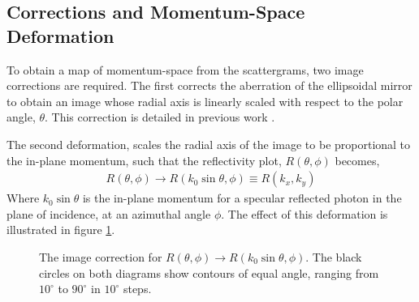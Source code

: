\subsection{Corrections and Momentum-Space Deformation\label{sec:corrections}}
To obtain a map of momentum-space from the scattergrams, two image corrections are required. The first corrects the aberration of the ellipsoidal mirror to obtain an image whose radial axis is linearly scaled with respect to the polar angle, $\theta$. This correction is detailed in previous work \cite{Stavenga2009a}. 

The second deformation, scales the radial axis of the image to be proportional to the in-plane momentum, such that the reflectivity plot, $R(\theta, \phi)$ becomes,
\begin{align*}
R(\theta,\phi) \rightarrow R(k_0\sin\theta,\phi)\equiv R(k_x,k_y)
\end{align*}
Where $k_0 \sin \theta$ is the in-plane momentum for a specular reflected photon in the plane of incidence, at an azimuthal angle $\phi$. The effect of this deformation is illustrated in figure \ref{fig:imagedeformation}. 
\begin{figure}
\begin{center}
\end{center}
\caption[The image correction for $R(\theta,\phi) \rightarrow R(k_0\sin\theta,\phi)$.]{The image correction for $R(\theta,\phi) \rightarrow R(k_0\sin\theta,\phi)$. The black circles on both diagrams show contours of equal angle, ranging from $10^\circ$ to $90^\circ$ in $10^\circ$ steps.\label{fig:imagedeformation}}
\end{figure}
